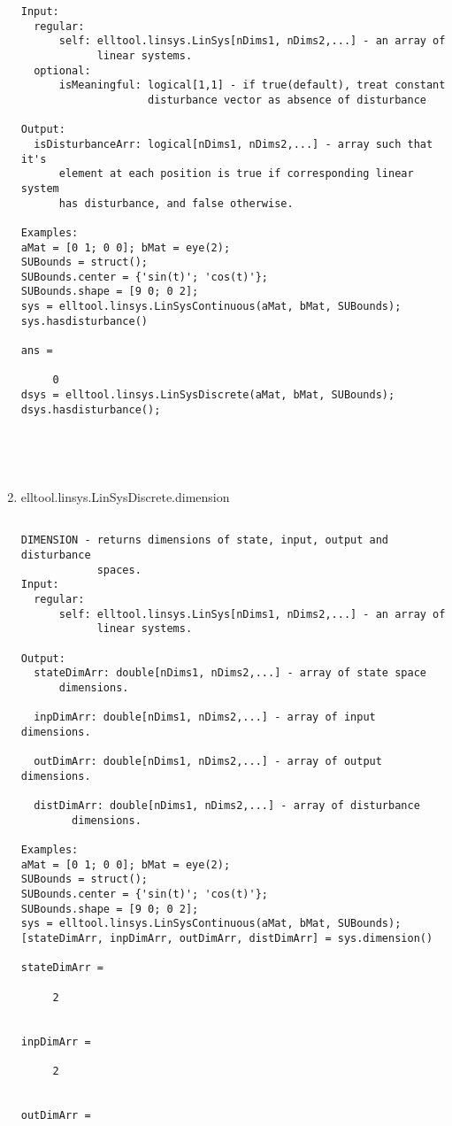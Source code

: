 \begin{enumerate}
\begin{lstlisting}
Input:
  regular:
      self: elltool.linsys.LinSys[nDims1, nDims2,...] - an array of
            linear systems.
  optional:
      isMeaningful: logical[1,1] - if true(default), treat constant
                    disturbance vector as absence of disturbance

Output:
  isDisturbanceArr: logical[nDims1, nDims2,...] - array such that it's
      element at each position is true if corresponding linear system
      has disturbance, and false otherwise.

Examples:
aMat = [0 1; 0 0]; bMat = eye(2);
SUBounds = struct();
SUBounds.center = {'sin(t)'; 'cos(t)'};
SUBounds.shape = [9 0; 0 2];
sys = elltool.linsys.LinSysContinuous(aMat, bMat, SUBounds);
sys.hasdisturbance()

ans =

     0
dsys = elltool.linsys.LinSysDiscrete(aMat, bMat, SUBounds);
dsys.hasdisturbance();





\end{lstlisting}
\fontfamily{\familydefault}
\selectfont
\item {elltool.linsys.LinSysDiscrete.dimension}
\selectfont
\begin{lstlisting}

DIMENSION - returns dimensions of state, input, output and disturbance
            spaces.
Input:
  regular:
      self: elltool.linsys.LinSys[nDims1, nDims2,...] - an array of
            linear systems.

Output:
  stateDimArr: double[nDims1, nDims2,...] - array of state space
      dimensions.

  inpDimArr: double[nDims1, nDims2,...] - array of input dimensions.

  outDimArr: double[nDims1, nDims2,...] - array of output dimensions.

  distDimArr: double[nDims1, nDims2,...] - array of disturbance
        dimensions.

Examples:
aMat = [0 1; 0 0]; bMat = eye(2);
SUBounds = struct();
SUBounds.center = {'sin(t)'; 'cos(t)'};
SUBounds.shape = [9 0; 0 2];
sys = elltool.linsys.LinSysContinuous(aMat, bMat, SUBounds);
[stateDimArr, inpDimArr, outDimArr, distDimArr] = sys.dimension()

stateDimArr =

     2


inpDimArr =

     2


outDimArr =


\end{lstlisting}
\end{enumerate}
